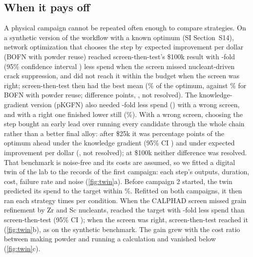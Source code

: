 \documentclass[11pt]{article}
\begin{document}
\subsection{When it pays off}
\label{sec:twin}

A physical campaign cannot be repeated often enough to compare strategies. On a
synthetic version of the workflow with a known optimum (SI Section~S14), network
optimization that chooses the step by expected improvement per dollar (BOFN with
powder reuse) reached screen-then-test's \$100k result with
-fold (95\% confidence interval
) less spend when the screen missed
nucleant-driven crack suppression, and did not reach it within the budget when
the screen was right; screen-then-test then had the best mean
(\% of the optimum, against
\% for BOFN with powder reuse; difference
 points, ,
not resolved). The
knowledge-gradient version (pKGFN) also needed -fold
less spend () with a wrong screen, and with a right
one finished lower still (\%). With a wrong screen, choosing the
step bought an early lead over running every candidate through the whole chain
rather than a better final alloy: after \$25k it was 
percentage points of the optimum ahead under the knowledge gradient (95\% CI
) and  under expected improvement per
dollar (, not resolved); at \$100k neither difference was
resolved. That benchmark is noise-free and its costs are assumed, so we fitted a
digital twin of the lab to the records of the first campaign: each step's
outputs, duration, cost, failure rate and noise (\cref{fig:twin}a).
Before campaign 2 started, the twin predicted its spend to the target within
\%. Refitted on both campaigns, it then ran each strategy
 times per condition. When the CALPHAD screen missed grain refinement by
Zr and Sc nucleants,  reached the target
with -fold less spend than screen-then-test (95\% CI ); when
the screen was right, screen-then-test reached it 
(\cref{fig:twin}b), as on the synthetic benchmark. The gain grew with
the cost ratio between making powder and running a calculation and vanished below
 (\cref{fig:twin}c).
\end{document}
